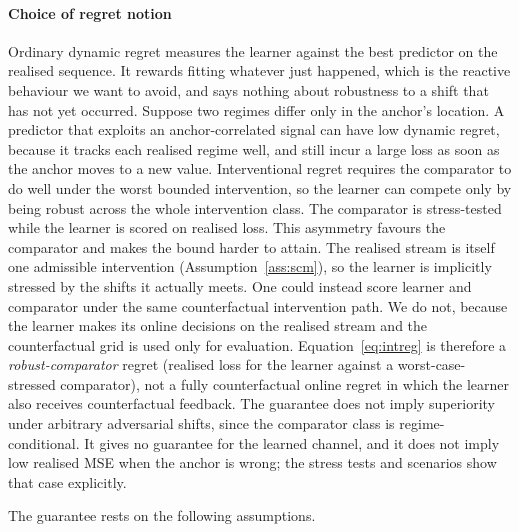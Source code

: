 \documentclass[authoryear,preprint,12pt]{elsarticle}
\theoremstyle{plain}
\theoremstyle{remark}
\begin{document}
\paragraph{Choice of regret notion} Ordinary dynamic regret measures the learner
against the best predictor on the realised sequence. It rewards fitting whatever just
happened, which is the reactive behaviour we want to avoid, and says nothing about
robustness to a shift that has not yet occurred. Suppose two regimes differ only in
the anchor's location. A predictor that exploits an anchor-correlated signal can have
low dynamic regret, because it tracks each realised regime well, and still incur a
large loss as soon as the anchor moves to a new value. Interventional regret requires
the comparator to do well under the worst bounded intervention, so the learner can
compete only by being robust across the whole intervention class. The comparator is
stress-tested while the learner is scored on realised loss. This asymmetry favours the
comparator and makes the bound harder to attain. The realised stream is itself one
admissible intervention (Assumption~\ref{ass:scm}), so the learner is implicitly
stressed by the shifts it actually meets. One could instead score learner and
comparator under the same counterfactual intervention path. We do not, because the
learner makes its online decisions on the realised stream and the counterfactual grid
is used only for evaluation. Equation~\eqref{eq:intreg} is therefore a
\emph{robust-comparator} regret (realised loss for the learner against a
worst-case-stressed comparator), not a fully counterfactual online regret in which the
learner also receives counterfactual feedback. The guarantee does not imply
superiority under arbitrary adversarial shifts, since the comparator class is
regime-conditional. It gives no guarantee for the learned channel, and it does not
imply low realised MSE when the anchor is wrong; the stress tests and scenarios show
that case explicitly.

The guarantee rests on the following assumptions.
\end{document}
